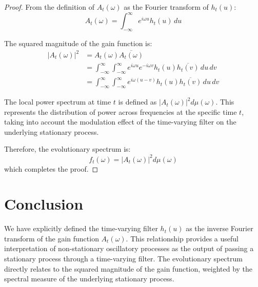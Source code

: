 \documentclass{article}
\theoremstyle{definition}
\begin{document}
\begin{proof}
From the definition of $A_t(\omega)$ as the Fourier transform of $h_t(u)$:
\begin{equation}
A_t(\omega) = \int_{-\infty}^{\infty} e^{i\omega u} h_t(u) \, du
\end{equation}

The squared magnitude of the gain function is:
\begin{align}
|A_t(\omega)|^2 &= A_t(\omega)\overline{A_t(\omega)} \\
&= \int_{-\infty}^{\infty} \int_{-\infty}^{\infty} e^{i\omega u} e^{-i\omega v} h_t(u) \overline{h_t(v)} \, du \, dv \\
&= \int_{-\infty}^{\infty} \int_{-\infty}^{\infty} e^{i\omega(u-v)} h_t(u) \overline{h_t(v)} \, du \, dv
\end{align}

The local power spectrum at time $t$ is defined as $|A_t(\omega)|^2 d\mu(\omega)$. This represents the distribution of power across frequencies at the specific time $t$, taking into account the modulation effect of the time-varying filter on the underlying stationary process.

Therefore, the evolutionary spectrum is:
\begin{equation}
f_t(\omega) = |A_t(\omega)|^2 d\mu(\omega)
\end{equation}
which completes the proof.
\end{proof}

\section{Conclusion}
We have explicitly defined the time-varying filter $h_t(u)$ as the inverse Fourier transform of the gain function $A_t(\omega)$. This relationship provides a useful interpretation of non-stationary oscillatory processes as the output of passing a stationary process through a time-varying filter. The evolutionary spectrum directly relates to the squared magnitude of the gain function, weighted by the spectral measure of the underlying stationary process.
\end{document}
